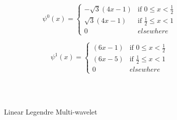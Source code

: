 \begin{equation}
\psi^0(x)=
\left\{
    \begin{array}{ll}
        -\sqrt{3}(4x-1)  & \mbox{if } 0 \leq x < \frac{1}{2} \\
        \sqrt{3}(4x-1)  & \mbox{if } \frac{1}{2} \leq x < 1 \\
        0 & elsewhere
    \end{array}
\right.
\end{equation}

\begin{equation}
\psi^1(x)=
\left\{
    \begin{array}{ll}
        (6x-1)  & \mbox{if } 0 \leq x < \frac{1}{2} \\
        (6x-5)  & \mbox{if } \frac{1}{2} \leq x < 1 \\
        0 & elsewhere
    \end{array}
\right.
\end{equation}

\begin{figure*}
\centering
{}\\
\\
\caption{Linear Legendre Multi-wavelet}
\label{fig:llmwphipsi}
\end{figure*}

